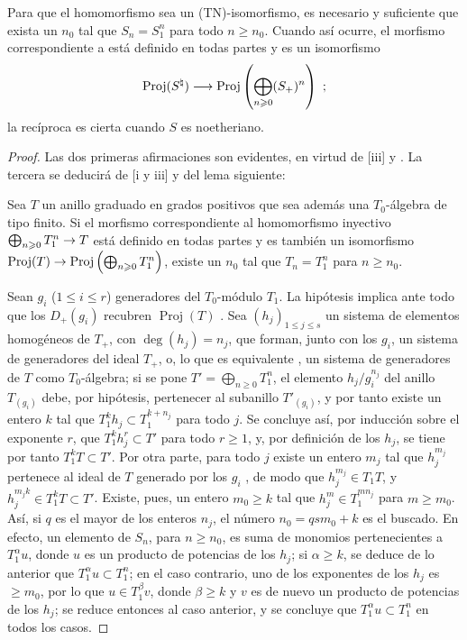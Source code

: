 \documentclass[oneside,10pt]{amsart}
\makeatletter
\renewcommand{\leq}{\leqslant}
\renewcommand{\geq}{\geqslant}
\newcommand{\ega@arrow}[2]{\mathchoice{#1}{#2}{#2}{#2}}
\renewcommand{\to}{\ega@arrow{\longrightarrow}{\rightarrow}}
\newcommand{\oldpage}[2][]{\marginnote{\normalfont\footnotesize\textbf{#1}~|~#2}\ignorespaces}
\let\EGAOriginalLabel\label
\renewcommand{\label}[1]{\phantomsection\EGAOriginalLabel{#1}}
\makeatother
\begin{document}
\begin{proposition}[8.2.14]
\label{II.8.2.14-fr}
Para que el homomorfismo  sea un \textup{(TN)}-isomorfismo, es necesario y suficiente que exista un $n_0$ tal que $S_n=S_1^n$ para todo $n\geq n_0$.
Cuando así ocurre, el morfismo correspondiente a  está definido en todas partes y es un isomorfismo
\[
  \operatorname{Proj}(S^{\natural})\to
  \operatorname{Proj}\left(\bigoplus_{n\geq0}(S_+)^n\right)~;
\]
la recíproca es cierta cuando $S$ es noetheriano.
\end{proposition}

\begin{proof}
Las dos primeras afirmaciones son evidentes, en virtud de [iii] y .
La tercera se deducirá de [i y iii] y del lema siguiente:
\begin{lemma}[8.2.14.1]
\label{II.8.2.14.1-fr}
Sea $T$ un anillo graduado en grados positivos que sea además una $T_0$-álgebra de tipo finito.
Si el morfismo correspondiente al homomorfismo inyectivo $\bigoplus_{n\geq0}T_1^n\to T$ está definido en todas partes y es también un isomorfismo $\operatorname{Proj}(T)\to\operatorname{Proj}\left(\bigoplus_{n\geq0}T_1^n\right)$, existe un $n_0$ tal que $T_n=T_1^n$ para $n\geq n_0$.
\end{lemma}

Sean $g_i$ ($1\leq i\leq r$) generadores del $T_0$-módulo $T_1$.
La hipótesis implica ante todo que los $D_+(g_i)$ recubren $\operatorname{Proj}(T)$ .
Sea $(h_j)_{1\leq j\leq s}$ un sistema de elementos homogéneos de $T_+$, con $\deg(h_j)=n_j$, que forman, junto con los $g_i$, un sistema de generadores del ideal $T_+$, o, lo que es equivalente , un sistema de generadores de $T$ como $T_0$-álgebra;
si se pone $T'=\bigoplus_{n\geq0}T_1^n$, el elemento $h_j/g_i^{n_j}$ del anillo $T_{(g_i)}$ debe, por hipótesis, pertenecer al subanillo $T'_{(g_i)}$, y por tanto existe un entero $k$ tal que $T_1^k h_j\subset T_1^{k+n_j}$ para todo $j$.
Se concluye así, por inducción sobre el exponente $r$, que $T_1^k h_j^r\subset T'$ para todo $r\geq1$, y, por definición de los $h_j$, se tiene por tanto $T_1^kT\subset T'$.
Por otra parte, para todo $j$ existe un entero $m_j$ tal que $h_j^{m_j}$ pertenece al ideal de $T$ generado por los $g_i$ , de modo que $h_j^{m_j}\in T_1T$, y
\oldpage[II]{162}
$h_j^{m_jk}\in T_1^kT\subset T'$.
Existe, pues, un entero $m_0\geq k$ tal que $h_j^m\in T_1^{mn_j}$ para $m\geq m_0$.
Así, si $q$ es el mayor de los enteros $n_j$, el número $n_0=qsm_0+k$ es el buscado.
En efecto, un elemento de $S_n$, para $n\geq n_0$, es suma de monomios pertenecientes a $T_1^\alpha u$, donde $u$ es un producto de potencias de los $h_j$;
si $\alpha\geq k$, se deduce de lo anterior que $T_1^\alpha u\subset T_1^n$;
en el caso contrario, uno de los exponentes de los $h_j$ es $\geq m_0$, por lo que $u\in T_1^\beta v$, donde $\beta\geq k$ y $v$ es de nuevo un producto de potencias de los $h_j$;
se reduce entonces al caso anterior, y se concluye que $T_1^\alpha u\subset T_1^n$ en todos los casos.
\end{proof}
\end{document}
